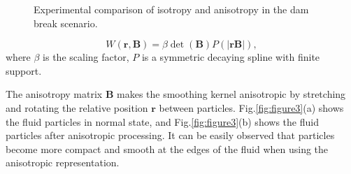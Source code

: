 \documentclass[times,twocolumn,final]{elsarticle}
\begin{document}
\begin{figure}[!t]
    \centering
    \caption{Experimental comparison of isotropy and anisotropy in the dam break scenario.}
    \label{fig:figure4}
\end{figure}

\begin{equation}
W(\mathbf{r},\mathbf{B})=\beta \operatorname{det}(\mathbf{B}) P(|\mathbf{r}\mathbf{B}|),
\label{con:equa10}
\end{equation}
where $\beta$ is the scaling factor, $P$ is a symmetric decaying spline with finite support.

The anisotropy matrix $\mathbf{B}$ makes the smoothing kernel anisotropic by stretching and rotating the relative position $\mathbf{r}$ between particles. Fig.\ref{fig:figure3}(a) shows the fluid particles in normal state, and Fig.\ref{fig:figure3}(b) shows the fluid particles after anisotropic processing. It can be easily observed that particles become more compact and smooth at the edges of the fluid when using the anisotropic representation.
\end{document}
